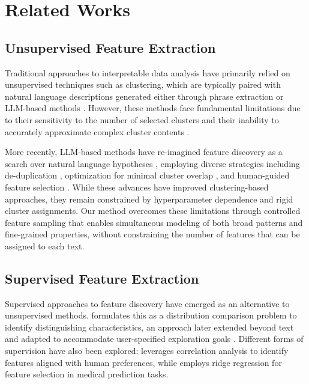 \section{Related Works}
\subsection{Unsupervised Feature Extraction}

Traditional approaches to interpretable data analysis have primarily relied on unsupervised techniques such as clustering, which are typically paired with natural language descriptions generated either through phrase extraction \citep{carmel2009, treeratpituk2006automatically, zhang2018taxogen} or LLM-based methods \citep{sorensen2024clio, lam2024concept, singh2023explaining}. However, these methods face fundamental limitations due to their sensitivity to the number of selected clusters and their inability to accurately approximate complex cluster contents \citep{chang2009reading}.

More recently, LLM-based methods have re-imagined feature discovery as a search over natural language hypotheses \citep{qiu2023phenomenal}, employing diverse strategies including de-duplication \citep{pham2023topicgpt}, optimization for minimal cluster overlap \citep{wang2023goal, zhong2024explaining}, and human-guided feature selection \citep{viswanathan2023large}. While these advances have improved clustering-based approaches, they remain constrained by hyperparameter dependence and rigid cluster assignments. Our method overcomes these limitations through controlled feature sampling that enables simultaneous modeling of both broad patterns and fine-grained properties, without constraining the number of features that can be assigned to each text.

\subsection{Supervised Feature Extraction}

Supervised approaches to feature discovery have emerged as an alternative to unsupervised methods. \citet{zhong2022describing} formulates this as a distribution comparison problem to identify distinguishing characteristics, an approach later extended beyond text \cite{dunlap2024describing} and adapted to accommodate user-specified exploration goals \cite{zhong2023goal}. Different forms of supervision have also been explored: \citet{findeis2024inverse} leverages correlation analysis to identify features aligned with human preferences, while \citet{benara2024crafting} employs ridge regression for feature selection in medical prediction tasks.

